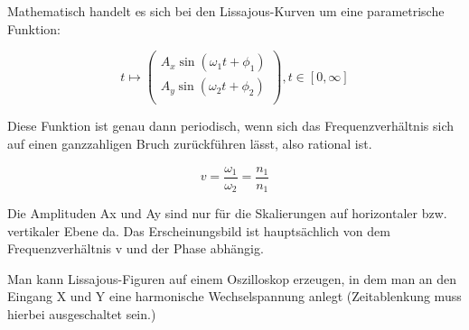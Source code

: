 \documentclass[a4paper,11pt]{article}
\begin{document}
Mathematisch handelt es sich bei den Lissajous-Kurven um eine parametrische Funktion:

\[
  t \mapsto
  \left(\begin{array}{rr}
    A_x \sin (\omega_1t+\phi_1) \\
    A_y \sin (\omega_2t+\phi_2) \\
  \end{array}\right), 
  t \in [0,\infty]
\]

Diese Funktion ist genau dann periodisch, wenn sich das Frequenzverhältnis sich auf einen ganzzahligen Bruch zurückführen lässt, also rational ist.

\[
  v = \frac{\omega_1}{\omega_2} = \frac{n_1}{n_1}
\]


Die Amplituden Ax und Ay sind nur für die Skalierungen auf horizontaler bzw. vertikaler Ebene da. Das Erscheinungsbild ist hauptsächlich von dem Frequenzverhältnis v und der Phase abhängig. 

Man kann Lissajous-Figuren auf einem Oszilloskop erzeugen, in dem man an den Eingang X und Y eine harmonische Wechselspannung anlegt (Zeitablenkung muss hierbei ausgeschaltet sein.) 
\end{document}

